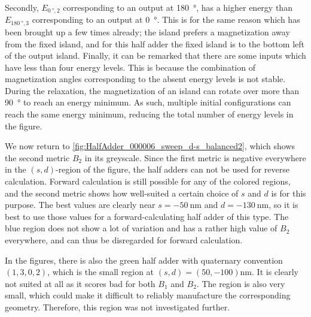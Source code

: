 \documentclass[11pt,a4paper,english]{article}
\begin{document}
Secondly, $E_{\SI{0}{\degree}, 2}$ corresponding to an output at \SI{180}{\degree}, has a higher energy than $E_{\SI{180}{\degree}, 3}$ corresponding to an output at \SI{0}{\degree}. This is for the same reason which has been brought up a few times already; the island prefers a magnetization away from the fixed island, and for this half adder the fixed island is to the bottom left of the output island.
Finally, it can be remarked that there are some inputs which have less than four energy levels. This is because the combination of magnetization angles corresponding to the absent energy levels is not stable. During the relaxation, the magnetization of an island can rotate over more than \SI{90}{\degree} to reach an energy minimum. As such, multiple initial configurations can reach the same energy minimum, reducing the total number of energy levels in the figure. \par

We now return to \cref{fig:HalfAdder_000006_sweep_d-s_balanced2}, which shows the second metric $B_2$ in its greyscale. Since the first metric is negative everywhere in the $(s,d)$-region of the figure, the half adders can not be used for reverse calculation. Forward calculation is still possible for any of the colored regions, and the second metric shows how well-suited a certain choice of $s$ and $d$ is for this purpose. The best values are clearly near $s=\SI{-50}{\nano\metre}$ and $d=\SI{-130}{\nano\metre}$, so it is best to use those values for a forward-calculating half adder of this type. The blue region does not show a lot of variation and has a rather high value of $B_2$ everywhere, and can thus be disregarded for forward calculation.

In the figures, there is also the green half adder with quaternary convention $(1,3,0,2)$, which is the small region at $(s,d) = (50, -100) \si{\nano\metre}$. It is clearly not suited at all as it scores bad for both $B_1$ and $B_2$. The region is also very small, which could make it difficult to reliably manufacture the corresponding geometry. Therefore, this region was not investigated further.
\end{document}
